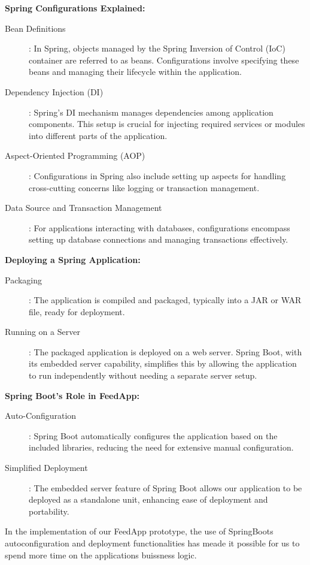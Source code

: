 \textbf{Spring Configurations Explained:}
\begin{description}
    \item[Bean Definitions]: In Spring, objects managed by the Spring Inversion of Control (IoC) container are referred to as beans. Configurations involve specifying these beans and managing their lifecycle within the application.
    \item[Dependency Injection (DI)]: Spring's DI mechanism manages dependencies among application components. This setup is crucial for injecting required services or modules into different parts of the application.
    \item[Aspect-Oriented Programming (AOP)]: Configurations in Spring also include setting up aspects for handling cross-cutting concerns like logging or transaction management.
    \item[Data Source and Transaction Management]: For applications interacting with databases, configurations encompass setting up database connections and managing transactions effectively.
\end{description}

\textbf{Deploying a Spring Application:}
\begin{description}
    \item[Packaging]: The application is compiled and packaged, typically into a JAR or WAR file, ready for deployment.
    \item[Running on a Server]: The packaged application is deployed on a web server. Spring Boot, with its embedded server capability, simplifies this by allowing the application to run independently without needing a separate server setup.
\end{description}

\textbf{Spring Boot's Role in FeedApp:}
\begin{description}
    \item[Auto-Configuration]: Spring Boot automatically configures the application based on the included libraries, reducing the need for extensive manual configuration.
    \item[Simplified Deployment]: The embedded server feature of Spring Boot allows our application to be deployed as a standalone unit, enhancing ease of deployment and portability.
\end{description}

In the implementation of our FeedApp prototype, the use of SpringBoots autoconfiguration and deployment functionalities has meade it possible for us to spend more time on the applications buissness logic. 

